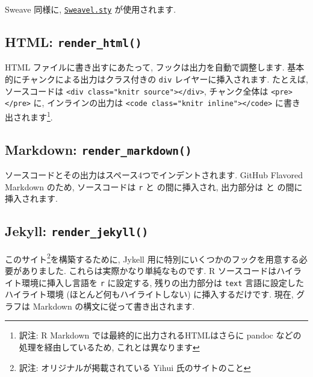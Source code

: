 \documentclass[
  lualatex,ja=standard,jafont=noto-otf]{bxjsreport}
\begin{document}
Sweave 同様に,
\href{https://github.com/yihui/knitr/blob/master/inst/misc/Sweavel.sty}{\texttt{Sweavel.sty}}
が使用されます.

\hypertarget{html-render_html}{%
\subsection{\texorpdfstring{HTML:
\texttt{render\_html()}}{HTML: render\_html()}}\label{html-render_html}}

HTML ファイルに書き出すにあたって, フックは出力を自動で調整します.
基本的にチャンクによる出力はクラス付きの \texttt{div}
レイヤーに挿入されます. たとえば, ソースコードは
\texttt{\textless{}div\ class="knitr\ source"\textgreater{}\textless{}/div\textgreater{}},
チャンク全体は
\texttt{\textless{}pre\textgreater{}\textless{}/pre\textgreater{}} に,
インラインの出力は
\texttt{\textless{}code\ class="knitr\ inline"\textgreater{}\textless{}/code\textgreater{}}
に書き出されます\footnote{訳注: R Markdown
  では最終的に出力されるHTMLはさらに pandoc
  などの処理を経由しているため, これとは異なります}.

\hypertarget{markdown-render_markdown}{%
\subsection{\texorpdfstring{Markdown:
\texttt{render\_markdown()}}{Markdown: render\_markdown()}}\label{markdown-render_markdown}}

ソースコードとその出力はスペース4つでインデントされます. GitHub Flavored
Markdown のため, ソースコードは
\texttt{\textasciigrave{}\textasciigrave{}\textasciigrave{}r} と
\texttt{\textasciigrave{}\textasciigrave{}\textasciigrave{}}
の間に挿入され, 出力部分は
\texttt{\textasciigrave{}\textasciigrave{}\textasciigrave{}} と
\texttt{\textasciigrave{}\textasciigrave{}\textasciigrave{}}
の間に挿入されます.

\hypertarget{jekyll-render_jekyll}{%
\subsection{\texorpdfstring{Jekyll:
\texttt{render\_jekyll()}}{Jekyll: render\_jekyll()}}\label{jekyll-render_jekyll}}

このサイト\footnote{訳注: オリジナルが掲載されている Yihui
  氏のサイトのこと}を構築するために, Jykell
用に特別にいくつかのフックを用意する必要がありました.
これらは実際かなり単純なものです. R
ソースコードはハイライト環境に挿入し言語を \texttt{r} に設定する,
残りの出力部分は \texttt{text} 言語に設定したハイライト環境
(ほとんど何もハイライトしない) に挿入するだけです. 現在, グラフは
Markdown の構文に従って書き出されます.
\end{document}
